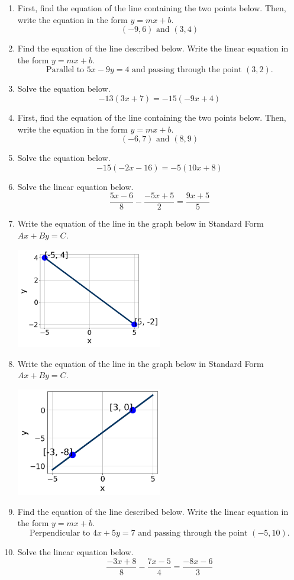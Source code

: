 \documentclass[14pt]{extbook}
\begin{document}
\begin{enumerate}
\item{
First, find the equation of the line containing the two points below. Then, write the equation in the form $ y=mx+b $.\[ (-9, 6) \text{ and } (3, 4) \]} \newpage
\item{
Find the equation of the line described below. Write the linear equation in the form $y=mx+b$.\[ \text{Parallel to } 5 x - 9 y = 4 \text{ and passing through the point } (3, 2). \]} \newpage
\item{
Solve the equation below.\[ -13(3x + 7) = -15(-9x + 4) \]} \newpage
\item{
First, find the equation of the line containing the two points below. Then, write the equation in the form $ y=mx+b $.\[ (-6, 7) \text{ and } (8, 9) \]} \newpage
\item{
Solve the equation below.\[ -15(-2x -16) = -5(10x + 8) \]} \newpage
\item{
Solve the linear equation below.\[ \frac{5x -6}{8} - \frac{-5x + 5}{2} = \frac{9x + 5}{5} \]} \newpage
\item{
Write the equation of the line in the graph below in Standard Form $Ax+By=C$.
\begin{center}
    \includegraphics[width=0.5\textwidth]{../Figures/linearGraphToStandardC.png}
\end{center}
} \newpage
\item{
Write the equation of the line in the graph below in Standard Form $Ax+By=C$.
\begin{center}
    \includegraphics[width=0.5\textwidth]{../Figures/linearGraphToStandardCopyC.png}
\end{center}
} \newpage
\item{
Find the equation of the line described below. Write the linear equation in the form $y=mx+b$.\[ \text{Perpendicular to } 4 x + 5 y = 7 \text{ and passing through the point } (-5, 10). \]} \newpage
\item{
Solve the linear equation below.\[ \frac{-3x + 8}{8} - \frac{7x -5}{4} = \frac{-8x -6}{3} \]} \newpage
\end{enumerate}
\end{document}
